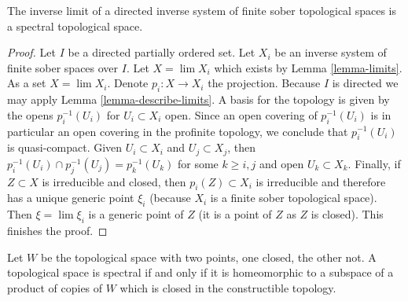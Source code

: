 \begin{lemma}
\label{lemma-directed-inverse-limit-finite-sober-spectral-spaces}
The inverse limit of a directed inverse system of finite sober
topological spaces is a spectral topological space.
\end{lemma}

\begin{proof}
Let $I$ be a directed partially ordered set. Let $X_i$ be an inverse
system of finite sober spaces over $I$. Let $X = \lim X_i$ which exists
by Lemma \ref{lemma-limits}. As a set $X = \lim X_i$. Denote
$p_i : X \to X_i$ the projection.
Because $I$ is directed we may apply Lemma \ref{lemma-describe-limits}.
A basis for the topology is given by the opens
$p_i^{-1}(U_i)$ for $U_i \subset X_i$ open. Since an open covering of
$p_i^{-1}(U_i)$ is in particular an open covering in the profinite
topology, we conclude that $p_i^{-1}(U_i)$ is quasi-compact.
Given $U_i \subset X_i$ and $U_j \subset X_j$, then
$p_i^{-1}(U_i) \cap p_j^{-1}(U_j) = p_k^{-1}(U_k)$
for some $k \geq i, j$ and open $U_k \subset X_k$. Finally, if $Z \subset X$
is irreducible and closed, then $p_i(Z) \subset X_i$ is irreducible
and therefore has a unique generic point $\xi_i$ (because $X_i$
is a finite sober topological space). Then $\xi = \lim \xi_i$ is a
generic point of $Z$ (it is a point of $Z$ as $Z$ is closed).
This finishes the proof.
\end{proof}

\begin{lemma}
\label{lemma-spectral-closed-in-product-two-point-space}
Let $W$ be the topological space with two points, one closed,
the other not. A topological space is spectral if and only if
it is homeomorphic to a subspace of a product of
copies of $W$ which is closed in the constructible topology.
\end{lemma}

